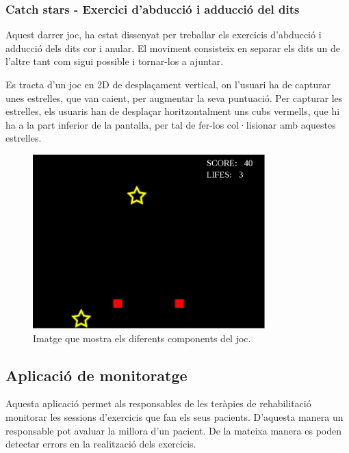 \documentclass[12pt,a4paper,catalan]{article}
\begin{document}
	\subsubsection{Catch stars - Exercici d'abducció i adducció del dits}
	Aquest darrer joc, ha estat dissenyat per treballar els exercicis d'abducció i adducció dels dits cor i anular. El moviment consisteix en separar els dits un de l'altre tant com sigui possible i tornar-los a ajuntar.
	
	Es tracta d'un joc en 2D de desplaçament vertical, on l'usuari ha de capturar unes estrelles, que van caient, per augmentar la seva puntuació. Per capturar les estrelles, els usuaris han de desplaçar horitzontalment uns cubs vermells, que hi ha a la part inferior de la pantalla, per tal de fer-los col·lisionar amb aquestes estrelles.
	\begin{figure}[H]
		\includegraphics[width=0.8\textwidth,keepaspectratio]{catch-stars-simple.png}
		\centering
		\caption{Imatge que mostra els diferents components del joc.}
		\label{fig:catch-stars-simple}
	\end{figure}
	\subsection{Aplicació de monitoratge}
	Aquesta aplicació permet als responsables de les teràpies de rehabilitació monitorar les sessions d'exercicis que fan els seus pacients. D'aquesta manera un responsable pot avaluar la millora d'un pacient. De la mateixa manera es poden detectar errors en la realització dels exercicis.
	
\end{document}
